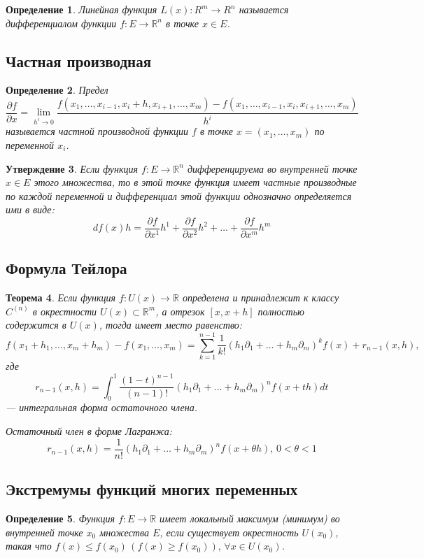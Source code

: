 \documentclass[12pt]{report}
\theoremstyle{plain}
\newtheorem{theorem}{Теорема}[chapter]
\newtheorem{definition}[theorem]{Определение}
\newtheorem{statement}[theorem]{Утверждение}
\newcommand{\R}{\mathbb R}
\begin{document}
\begin{definition}
Линейная функция $L(x): R^m \rightarrow R^n$ называется дифференциалом
функции $f: E \rightarrow \R^n$ в точке $x \in E$.
\end{definition}

\subsection{Частная производная}
\begin{definition}
Предел
$$
\dfrac{\partial f}{\partial x} = 
\lim\limits_{h^i \rightarrow 0} \dfrac{f(x_1, \dots, x_{i-1}, x_i + h, x_{i+1}, \dots, x_m) 
- f(x_1, \dots, x_{i-1}, x_i, x_{i+1}, \dots, x_m)}{h^i}
$$
называется частной производной функции $f$ в точке $x = (x_1, \dots, x_m)$ по переменной $x_i$.
\end{definition}

\begin{statement}
Если функция $f: E \rightarrow \R^n$ дифференцируема во внутренней точке
$x \in E$ этого множества, то в этой точке функция имеет частные производные
по каждой переменной и дифференциал этой функции однозначно определяется ими в виде:
$$
df(x)h = \dfrac{\partial f}{\partial x^1}h^1 + \dfrac{\partial f}{\partial x^2} h^2 
+ \dots + \dfrac{\partial f}{\partial x^m} h^m
$$
\end{statement}

\subsection{Формула Тейлора}
\begin{theorem}
Если функция $f: U(x) \rightarrow \R$ определена и принадлежит к классу
$C^{(n)}$ в окрестности $U(x) \subset \R^m$, а отрезок $[x, x+h]$ полностью
содержится в $U(x)$, тогда имеет место равенство:
$$
f(x_1 + h_1, \dots, x_m + h_m) - f(x_1, \dots, x_m) =
\sum\limits_{k=1}^{n-1} \dfrac{1}{k!} (h_1 \partial_1 + \dots + h_m \partial_m)^k f(x) + r_{n-1}(x, h),
$$
где
$$
r_{n-1}(x, h) = \int_0^1 \dfrac{(1 - t)^{n-1}}{(n - 1)!} (h_1 \partial_1 + \dots + h_m \partial_m)^n f(x + th) dt
$$
--- интегральная форма остаточного члена.

Остаточный член в форме Лагранжа:
$$
r_{n-1}(x, h) = \dfrac{1}{n!} (h_1 \partial_1 + \dots + h_m \partial_m)^n f(x + \theta h),
\, 0 < \theta < 1
$$
\end{theorem}

\subsection{Экстремумы функций многих переменных}
\begin{definition}
Функция $f: E \rightarrow \R$ имеет локальный максимум (минимум)
во внутренней точке $x_0$ множества $E$, если существует окрестность
$U(x_0)$, такая что $f(x) \le f(x_0)\,(f(x) \ge f(x_0)), \, \forall x \in U(x_0)$.
\end{definition}
\end{document}
